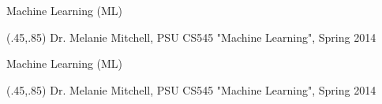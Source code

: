 \documentclass{beamer}
\begin{document}
\begin{frame}{Machine Learning (ML)}



\begin{textblock}{1}(.45,.85)
  \tiny{Dr. Melanie Mitchell, PSU CS545 "Machine Learning", Spring 2014}
\end{textblock}
\end{frame}

\begin{frame}{Machine Learning (ML)}



\begin{textblock}{1}(.45,.85)
  \tiny{Dr. Melanie Mitchell, PSU CS545 "Machine Learning", Spring 2014}
\end{textblock}
\end{frame}
\end{document}
